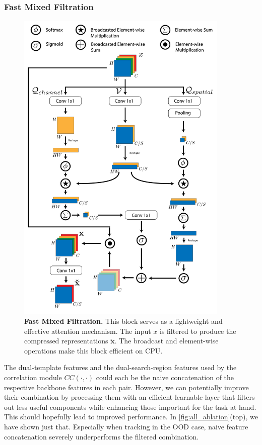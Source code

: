 \subsubsection{Fast Mixed Filtration}
\begin{figure}[t]
  \centering
  \includegraphics[width=0.9\textwidth]{figures/figure7.pdf}
   \caption{\textbf{Fast Mixed Filtration.} This block serves as a lightweight and effective attention mechanism. The input $x$ is filtered to produce the compressed representations $\boldsymbol{\check{x}}$. The broadcast and element-wise operations make this block efficient on CPU. }
   \label{fig:attention2}
\end{figure}
The dual-template features and the dual-search-region features used by the correlation module $CC(\cdot,\cdot)$ could each be the naive concatenation of the respective backbone features in each pair. However, we can potentially improve their combination by processing them with an efficient learnable layer that filters out less useful components while enhancing those important for the task at hand. This should hopefully lead to improved performance. In \ref{fig:all_ablation}(top), we have shown just that. Especially when tracking in the OOD case, naive feature concatenation severely underperforms the filtered combination.

